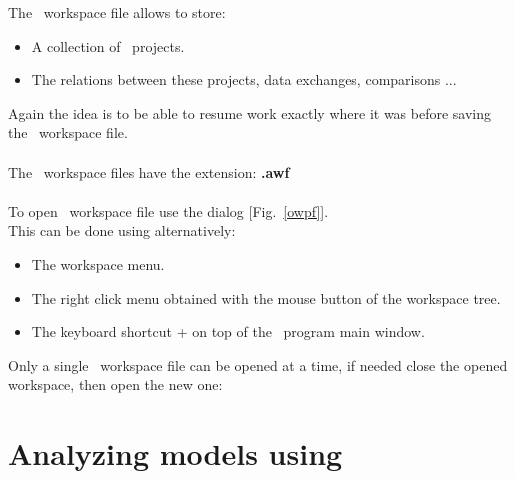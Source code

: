 The \atomes\ workspace file allows to store:
\begin{itemize}
\item A collection of \atomes\ projects. 
\item The relations between these projects, data exchanges, comparisons ...
\end{itemize}
Again the idea is to be able to resume work exactly where it was before saving the \atomes\ workspace file. \\
\\The \atomes\ workspace files have the extension: {\bf{.awf}}\\
\\
To open \atomes\ workspace file use the  dialog [Fig.~\ref{owpf}]. \\
This can be done using alternatively: 
\begin{itemize}
\item The workspace menu.
\item The right click menu obtained with the mouse button of the workspace tree.
\item The keyboard shortcut \Ctrl +  on top of the \atomes\ program main window. 
\end{itemize}
Only a single \atomes\ workspace file can be opened at a time, if needed close the opened workspace, then open the new one: 
\owpfig

\clearpage

\section{Analyzing models using \atomes}
\label{calc}

